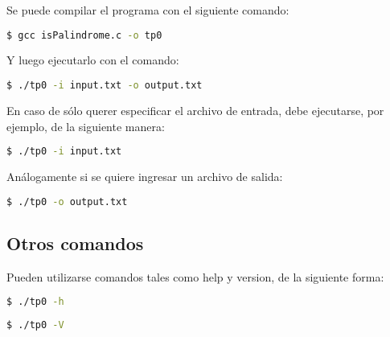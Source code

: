 \documentclass[a4paper]{article}
\begin{document}
Se puede compilar el programa con el siguiente comando:

\begin{lstlisting}[language=bash]
  $ gcc isPalindrome.c -o tp0
\end{lstlisting}


Y luego ejecutarlo con el comando:

\begin{lstlisting}[language=bash]
  $ ./tp0 -i input.txt -o output.txt
\end{lstlisting}

En caso de sólo querer especificar el archivo de entrada, debe ejecutarse, por ejemplo, de la siguiente manera:

\begin{lstlisting}[language=bash]
  $ ./tp0 -i input.txt
\end{lstlisting}

Análogamente si se quiere ingresar un archivo de salida:

\begin{lstlisting}[language=bash]
  $ ./tp0 -o output.txt
\end{lstlisting}

\subsection{Otros comandos}

Pueden utilizarse comandos tales como help y version, de la siguiente forma:

\begin{lstlisting}[language=bash]
  $ ./tp0 -h
\end{lstlisting}

\begin{lstlisting}[language=bash]
  $ ./tp0 -V
\end{lstlisting}
\end{document}
